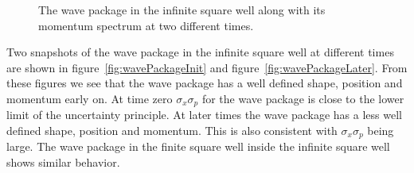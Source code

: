 \documentclass[12pt,a4paper]{article}
\begin{document}
\begin{figure}
\begin{center}
\caption{The wave package in the infinite square well along with its momentum spectrum at two different times.}
\end{center}
\end{figure}

Two snapshots of the wave package in the infinite square well at different times are shown in figure~\ref{fig:wavePackageInit} and figure~\ref{fig:wavePackageLater}. From these figures we see that the wave package has a  well defined shape, position and momentum early on. At time zero $\sigma_x \sigma_p$ for the wave package is close to the lower limit of the uncertainty principle. At later times the wave package has a less well defined shape, position and momentum. This is also consistent with $\sigma_x \sigma_p$ being large. The wave package in the finite square well inside the infinite square well shows similar behavior.
\end{document}
